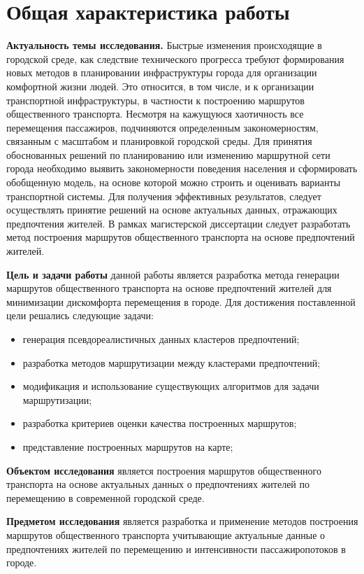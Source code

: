 \section{Общая характеристика работы}
\textbf{Актуальность темы исследования.} Быстрые изменения происходящие в городской среде, как следствие 
технического прогресса требуют формирования новых методов в планировании инфраструктуры города для 
организации комфортной жизни людей. Это относится, в том числе, и к организации транспортной 
инфраструктуры, в частности к построению маршрутов общественного транспорта. Несмотря на кажущуюся 
хаотичность все перемещения пассажиров, подчиняются определенным закономерностям, связанным с масштабом и 
планировкой городской среды. Для принятия обоснованных решений по планированию или изменению маршрутной 
сети города необходимо выявить закономерности поведения населения и сформировать обобщенную модель, на 
основе которой можно строить и оценивать варианты транспортной системы. Для получения эффективных 
результатов, следует осуществлять принятие решений на основе актуальных данных, отражающих предпочтения 
жителей. В рамках магистерской диссертации следует разработать метод построения маршрутов общественного 
транспорта на основе предпочтений жителей.

\textbf{Цель и задачи работы} данной работы является разработка метода генерации маршрутов общественного 
транспорта на основе предпочтений жителей для минимизации дискомфорта перемещения в городе. Для достижения 
поставленной цели решались следующие задачи:
\begin{itemize}
    \item генерация псевдореалистичных данных кластеров предпочтений;
    \item разработка методов маршрутизации между кластерами предпочтений;
    \item модификация и использование существующих алгоритмов для задачи маршрутизации;
    \item разработка критериев оценки качества построенных маршрутов;
    \item представление построенных маршрутов на карте;
\end{itemize}

\textbf{Объектом исследования} является построения маршрутов общественного транспорта на основе актуальных 
данных о предпочтениях жителей по перемещению в современной городской среде. 

\textbf{Предметом исследования} является разработка и применение методов построения маршрутов общественного 
транспорта учитывающие актуальные данные о предпочтениях жителей по перемещению и интенсивности 
пассажиропотоков в городе.

